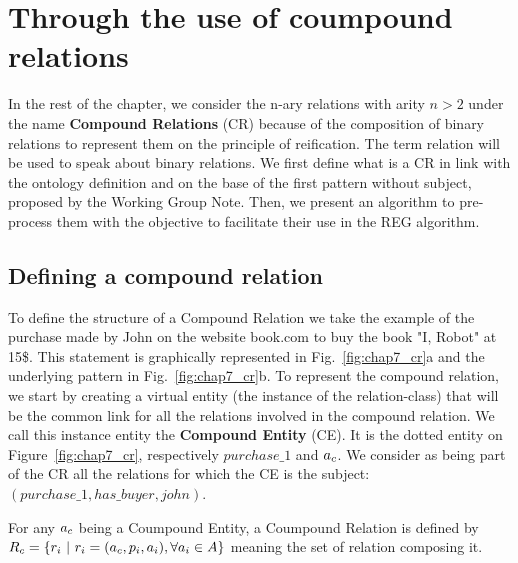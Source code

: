 \section{Through the use of coumpound relations}

In the rest of the chapter, we consider the n-ary relations with arity $n > 2$ under the name \textbf{Compound Relations} (CR) because of the composition of binary relations to represent them on the principle of reification. The term relation will be used to speak about binary relations. We first define what is a CR in link with the ontology definition and on the base of the first pattern without subject, proposed by the Working Group Note. Then, we present an algorithm to pre-process them with the objective to facilitate their use in the REG algorithm.

\subsection{Defining a compound relation}

To define the structure of a Compound Relation we take the example of the purchase made by John on the website book.com to buy the book "I, Robot" at 15\$. This statement is graphically represented in Fig.~\ref{fig:chap7_cr}a and the underlying pattern in Fig.~\ref{fig:chap7_cr}b. To represent the compound relation, we start by creating a virtual entity (the instance of the relation-class) that will be the common link for all the relations involved in the compound relation. We call this instance entity the \textbf{Compound Entity} (CE). It is the dotted entity on Figure~\ref{fig:chap7_cr}, respectively $purchase\_1$ and $a_c$. We consider as being part of the CR all the relations for which the CE is the subject: $(purchase\_1, has\_buyer, john)$. 

\begin{theorem} 
\label{the:compound_relation}
For any $a_c$ being a Coumpound Entity, a Coumpound Relation is defined by $R_c = \{ r_i\ |\  r_i = (a_c, p_i, a_i), \forall a_i \in A\}$ meaning the set of relation composing it.
\end{theorem}

